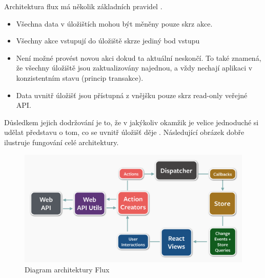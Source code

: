 \vspace{3mm}
\noindent Architektura flux má několik základních pravidel \cite{react_book} \cite{flux}.

\begin{itemize}
\item Všechna data v úložištích mohou být měněny pouze skrz akce.
\item Všechny akce vstupují do úložiště skrze jediný bod vstupu 
\item Není možné provést novou akci dokud ta aktuální neskončí. To také znamená, že všechny úložiště jsou zaktualizovány najednou, a vždy nechají aplikaci v konzistentním stavu (princip transakce).
\item Data uvnitř úložišť jsou přístupná z vnějšku pouze skrz read-only veřejné API.
\end{itemize}

Důsledkem jejich dodržování je to, že v jakýkoliv okamžik je velice jednoduché si udělat představu o tom, co se uvnitř úložišť děje \cite{react_book}. Následující obrázek dobře ilustruje fungování celé architektury.

\begin{figure}[h]
\begin{centering}
\includegraphics[scale=0.3]{obrazky/flux_architecture}
\par\end{centering}
\caption{Diagram architektury Flux \cite{flux} \label{fig:flug_architecture}}
\end{figure}
\FloatBarrier

